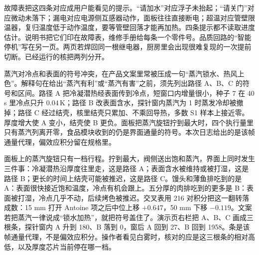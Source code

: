 故障表把这四条对应成用户能看见的提示。“请加水”对应浮子未抬起；“请关门”对应微动未落下；漏电对应电源侧互感器动作，面板往往直接断电；超温对应管壁限温器，复归温度低于动作温度，要等管壁回落才能再加热。四条提示都不读取进度估计。说明书把它们印在故障表，维修手册给每条一个零件号。品质回路的“智能停机”写在另一页。两页若焊回同一根继电器，厨房里会出现很难复现的一次提前切断。已经运行的核把两列分开。

蒸汽对冷点和表面的符号冲突，在产品文案里常被压成一句“蒸汽锁水、热风上色”。解释句在给出“蒸汽有利”或“蒸汽有害”之前，须先列出路径 A、B、C 的符号和区间。路径 A 把冷凝潜热经表面传到冷点，短窗口内增量很小，种子 7 在 40 s 里冷点只升 \(0.04\,\mathrm{K}\)；路径 B 改表面含水，探针窗内蒸汽为 1 时蒸发冷却被撤掉；路径 C 经过结壳，核里结壳只累加、不乘回导热，多数 S1 样本上接近零。厚度增大使 A 变小，结壳使 B 更负。面板把蒸汽旋钮拧到最大时，四个执行量里只有蒸汽列离开零，食品模块收到的仍是界面通量的符号。本次日志给出的是该帧通量代理，偏效应积分留在规格里。

面板上的蒸汽旋钮只有一档行程。拧到最大，阀侧送出饱和蒸汽，界面上同时发生三件事：冷凝潜热沿厚度往里走，这是路径 A；表面含水被维持或被打湿，这是路径 B；更长的时间上结壳可能被推迟，这是路径 C。馒头和薄鱼排吃到的是 A：表面很快接近饱和温度，冷点有机会跟上。五分厚的肉排吃到的更多是 B：表面被打湿，冷点几乎不动，后续烤色被推迟。交叉表用 216 对积分把这一翻转落成数：15 mm 打开 Antoine 项之后中位上移 \(+0.647\)，50 mm 下移 \(-0.119\)。文案若把蒸汽一律说成“锁水加热”，就把符号盖住了。演示页右栏把 A、B、C 画成三根条，探针窗内 A 升到 180、B 落到 0，窗后 A 回到 27、B 回到 1958。条是该帧通量代理，不是偏效应积分。操作者看见白雾时，核对的应是这三根条的相对高低，以及厚度芯片当前停在哪一档。

\FloatBarrier
